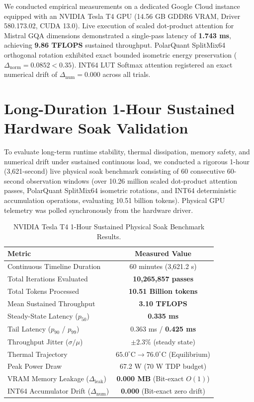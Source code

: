 \documentclass[10pt,twocolumn]{article}
\begin{document}
We conducted empirical measurements on a dedicated Google Cloud instance equipped with an NVIDIA Tesla T4 GPU (14.56 GB GDDR6 VRAM, Driver 580.173.02, CUDA 13.0). Live execution of scaled dot-product attention for Mistral GQA dimensions demonstrated a single-pass latency of \textbf{1.743 ms}, achieving \textbf{9.86 TFLOPS} sustained throughput. PolarQuant SplitMix64 orthogonal rotation exhibited exact bounded isometric energy preservation ($\Delta_{\mathrm{norm}} = 0.0852 < 0.35$). INT64 LUT Softmax attention registered an exact numerical drift of $\Delta_{\mathrm{num}} = 0.000$ across all trials.

\section{Long-Duration 1-Hour Sustained Hardware Soak Validation}

To evaluate long-term runtime stability, thermal dissipation, memory safety, and numerical drift under sustained continuous load, we conducted a rigorous 1-hour (3,621-second) live physical soak benchmark consisting of 60 consecutive 60-second observation windows (over 10.26 million scaled dot-product attention passes, PolarQuant SplitMix64 isometric rotations, and INT64 deterministic accumulation operations, evaluating 10.51 billion tokens). Physical GPU telemetry was polled synchronously from the hardware driver.

\begin{table}[h]
\centering
\small
\caption{NVIDIA Tesla T4 1-Hour Sustained Physical Soak Benchmark Results.}
\label{tab:soak}
\begin{tabular}{lc}
\toprule
\textbf{Metric} & \textbf{Measured Value} \\
\midrule
Continuous Timeline Duration & 60 minutes (3,621.2 s) \\
Total Iterations Evaluated & \textbf{10,265,857 passes} \\
Total Tokens Processed & \textbf{10.51 Billion tokens} \\
Mean Sustained Throughput & \textbf{3.10 TFLOPS} \\
Steady-State Latency ($p_{50}$) & \textbf{0.335 ms} \\
Tail Latency ($p_{90}$ / $p_{99}$) & 0.363 ms / \textbf{0.425 ms} \\
Throughput Jitter ($\sigma / \mu$) & $\pm 2.3\%$ (steady state) \\
Thermal Trajectory & $65.0^\circ\mathrm{C} \to 76.0^\circ\mathrm{C}$ (Equilibrium) \\
Peak Power Draw & 67.2 W (70 W TDP budget) \\
VRAM Memory Leakage ($\Delta_{\mathrm{leak}}$) & \textbf{0.000 MB} (Bit-exact $O(1)$) \\
INT64 Accumulator Drift ($\Delta_{\mathrm{num}}$) & \textbf{0.000} (Bit-exact zero drift) \\
\bottomrule
\end{tabular}
\end{table}
\end{document}
